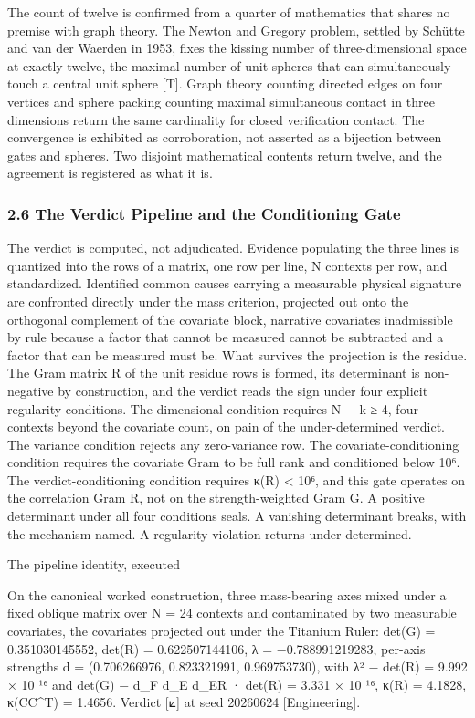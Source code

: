 \documentclass[10pt,twocolumn]{article}
\begin{document}
The count of twelve is confirmed from a quarter of mathematics that
shares no premise with graph theory. The Newton and Gregory problem,
settled by Schütte and van der Waerden in 1953, fixes the kissing number
of three-dimensional space at exactly twelve, the maximal number of unit
spheres that can simultaneously touch a central unit sphere {[}T{]}.
Graph theory counting directed edges on four vertices and sphere packing
counting maximal simultaneous contact in three dimensions return the
same cardinality for closed verification contact. The convergence is
exhibited as corroboration, not asserted as a bijection between gates
and spheres. Two disjoint mathematical contents return twelve, and the
agreement is registered as what it is.

\hypertarget{the-verdict-pipeline-and-the-conditioning-gate}{%
\subsubsection{2.6 The Verdict Pipeline and the Conditioning
Gate}\label{the-verdict-pipeline-and-the-conditioning-gate}}

The verdict is computed, not adjudicated. Evidence populating the three
lines is quantized into the rows of a matrix, one row per line, N
contexts per row, and standardized. Identified common causes carrying a
measurable physical signature are confronted directly under the mass
criterion, projected out onto the orthogonal complement of the covariate
block, narrative covariates inadmissible by rule because a factor that
cannot be measured cannot be subtracted and a factor that can be
measured must be. What survives the projection is the residue. The Gram
matrix R of the unit residue rows is formed, its determinant is
non-negative by construction, and the verdict reads the sign under four
explicit regularity conditions. The dimensional condition requires N − k
≥ 4, four contexts beyond the covariate count, on pain of the
under-determined verdict. The variance condition rejects any
zero-variance row. The covariate-conditioning condition requires the
covariate Gram to be full rank and conditioned below 10⁶. The
verdict-conditioning condition requires κ(R) \textless{} 10⁶, and this
gate operates on the correlation Gram R, not on the strength-weighted
Gram G. A positive determinant under all four conditions seals. A
vanishing determinant breaks, with the mechanism named. A regularity
violation returns under-determined.

\begin{jbox}{The pipeline identity, executed}

On the canonical worked construction, three mass-bearing axes mixed
under a fixed oblique matrix over N = 24 contexts and contaminated by
two measurable covariates, the covariates projected out under the
Titanium Ruler: det(G) = 0.351030145552, det(R) = 0.622507144106, λ =
−0.788991219283, per-axis strengths d = (0.706266976, 0.823321991,
0.969753730), with \textbar λ² − det(R)\textbar{} = 9.992 × 10⁻¹⁶ and
\textbar det(G) − d\_F d\_E d\_ER · det(R)\textbar{} = 3.331 × 10⁻¹⁶,
κ(R) = 4.1828, κ(CC\^{}T) = 1.4656. Verdict {[}⟀{]} at seed 20260624
{[}Engineering{]}.

\end{jbox}
\end{document}
